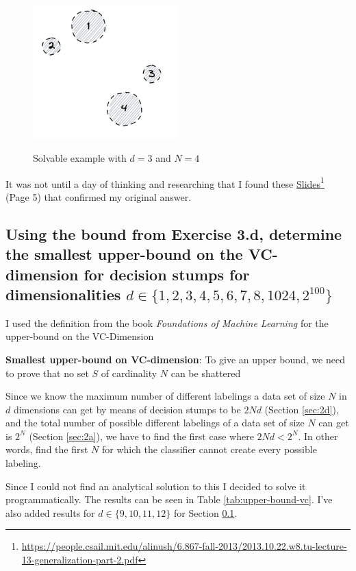 \documentclass[11pt,a4paper]{article}
\begin{document}
\begin{figure}[h]
    \caption{Solvable example with $d=3$ and $N=4$}
    \centering
    \includegraphics[width=0.5\textwidth]{d3n4_solvable.png}
    \label{fig:d3n4_solvable}
\end{figure}


It was not until a day of thinking and researching that I found these \href{https://people.csail.mit.edu/alinush/6.867-fall-2013/2013.10.22.w8.tu-lecture-13-generalization-part-2.pdf}{\underline{Slides}}\footnote{\url{https://people.csail.mit.edu/alinush/6.867-fall-2013/2013.10.22.w8.tu-lecture-13-generalization-part-2.pdf}} (Page 5) that confirmed my original answer.

\subsection{Using the bound from Exercise 3.d, determine the smallest upper-bound on the VC-dimension for decision stumps for dimensionalities $d ∈ \{1, 2, 3, 4, 5, 6, 7, 8, 1024, 2^{100}\}$}
\label{sec:2e}
I used the definition from the book \textit{Foundations of Machine Learning} \cite{foundations_of_machine_learning} for the upper-bound on the VC-Dimension

\textbf{Smallest upper-bound on VC-dimension}: To give an upper bound, we need to prove that no set $S$ of cardinality $N$ can be shattered

Since we know the maximum number of different labelings a data set of size $N$ in $d$ dimensions can get by means of decision stumps to be $2Nd$ (Section \ref{sec:2d}), and the total number of possible different labelings of a data set of size $N$ can get is $2^N$ (Section \ref{sec:2a}), we have to find the first case where $2Nd < 2^N$. In other words, find the first $N$ for which the classifier cannot create every possible labeling.

Since I could not find an analytical solution to this I decided to solve it programmatically. The results can be seen in Table \ref{tab:upper-bound-vc}. I've also added results for $d \in \{9, 10, 11, 12\}$ for Section \ref{sec:2e}.
\end{document}
